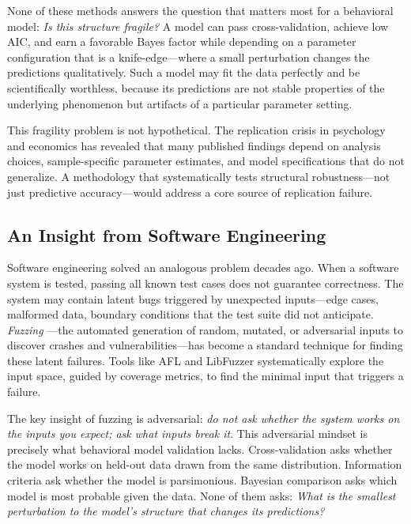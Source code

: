 \documentclass[12pt]{article}
\begin{document}
None of these methods answers the question that matters most for a behavioral model: \emph{Is this structure fragile?}  A model can pass cross-validation, achieve low AIC, and earn a favorable Bayes factor while depending on a parameter configuration that is a knife-edge---where a small perturbation changes the predictions qualitatively.  Such a model may fit the data perfectly and be scientifically worthless, because its predictions are not stable properties of the underlying phenomenon but artifacts of a particular parameter setting.

This fragility problem is not hypothetical.  The replication crisis in psychology and economics \cite{ioannidis2005,open2015} has revealed that many published findings depend on analysis choices, sample-specific parameter estimates, and model specifications that do not generalize.  A methodology that systematically tests structural robustness---not just predictive accuracy---would address a core source of replication failure.

\subsection{An Insight from Software Engineering}

Software engineering solved an analogous problem decades ago.  When a software system is tested, passing all known test cases does not guarantee correctness.  The system may contain latent bugs triggered by unexpected inputs---edge cases, malformed data, boundary conditions that the test suite did not anticipate.  \emph{Fuzzing} \cite{miller1990,takanen2008}---the automated generation of random, mutated, or adversarial inputs to discover crashes and vulnerabilities---has become a standard technique for finding these latent failures.  Tools like AFL \cite{zalewski2014} and LibFuzzer \cite{serebryany2016} systematically explore the input space, guided by coverage metrics, to find the minimal input that triggers a failure.

The key insight of fuzzing is adversarial: \emph{do not ask whether the system works on the inputs you expect; ask what inputs break it}.  This adversarial mindset is precisely what behavioral model validation lacks.  Cross-validation asks whether the model works on held-out data drawn from the same distribution.  Information criteria ask whether the model is parsimonious.  Bayesian comparison asks which model is most probable given the data.  None of them asks: \emph{What is the smallest perturbation to the model's structure that changes its predictions?}
\end{document}
